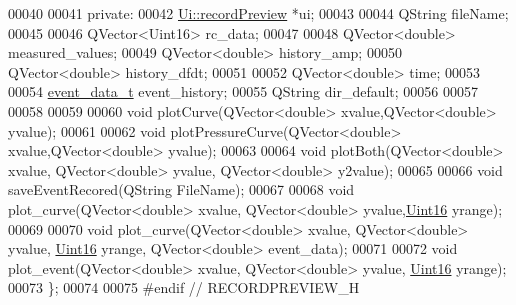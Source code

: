 \begin{DoxyCode}
00040 
00041 \textcolor{keyword}{private}:
00042     \hyperlink{a00021}{Ui::recordPreview} *ui;
00043 
00044     QString fileName;
00045 
00046     QVector<Uint16> rc\_data;
00047 
00048     QVector<double> measured\_values;
00049     QVector<double> history\_amp;
00050     QVector<double> history\_dfdt;
00051 
00052     QVector<double> time;
00053 
00054     \hyperlink{a00003_d0/d89/a00071}{event\_data\_t} event\_history;
00055     QString dir\_default;
00056 
00057 
00058 
00059 
00060     \textcolor{keywordtype}{void} plotCurve(QVector<double> xvalue,QVector<double> yvalue);
00061 
00062     \textcolor{keywordtype}{void} plotPressureCurve(QVector<double> xvalue,QVector<double> yvalue);
00063 
00064     \textcolor{keywordtype}{void} plotBoth(QVector<double> xvalue, QVector<double> yvalue, QVector<double> y2value);
00065 
00066     \textcolor{keywordtype}{void} saveEventRecored(QString FileName);
00067 
00068     \textcolor{keywordtype}{void} plot\_curve(QVector<double> xvalue, QVector<double> yvalue,\hyperlink{a00001_aae7407b021d43f7193a81a58cfb3e297}{Uint16} yrange);
00069 
00070     \textcolor{keywordtype}{void} plot\_curve(QVector<double> xvalue, QVector<double> yvalue, \hyperlink{a00001_aae7407b021d43f7193a81a58cfb3e297}{Uint16} yrange, QVector<double> 
      event\_data);
00071 
00072     \textcolor{keywordtype}{void} plot\_event(QVector<double> xvalue, QVector<double> yvalue, \hyperlink{a00001_aae7407b021d43f7193a81a58cfb3e297}{Uint16} yrange);
00073 \};
00074 
00075 \textcolor{preprocessor}{#endif // RECORDPREVIEW\_H}
\end{DoxyCode}
